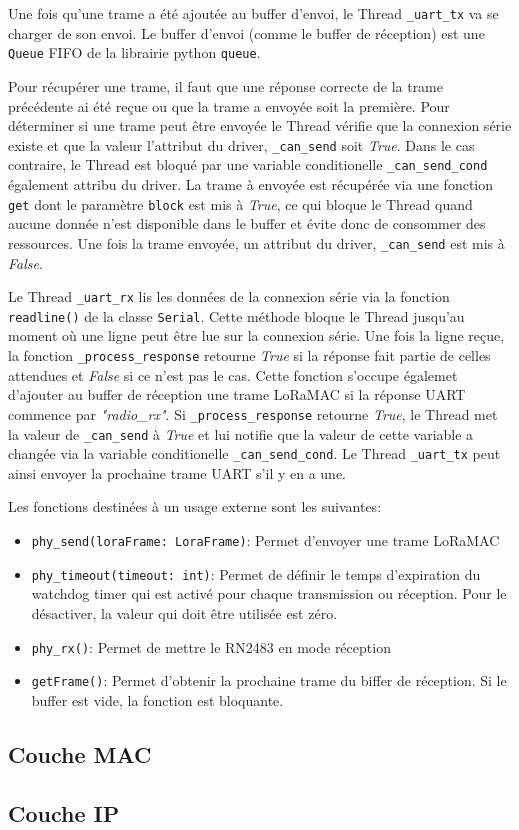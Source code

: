     Une fois qu'une trame a été ajoutée au buffer d'envoi, le Thread \texttt{\_uart\_tx} va se charger de 
    son envoi. Le buffer d'envoi (comme le buffer de réception) est une \texttt{Queue} FIFO de la librairie python \texttt{queue}.
    
    Pour récupérer une trame, il faut que une réponse correcte de la trame précédente ai été reçue ou que la trame a envoyée soit la première.
    Pour déterminer si une trame peut être envoyée le Thread vérifie que la connexion série existe 
    et que la valeur l'attribut du driver, \texttt{\_can\_send} soit \textit{True}. Dans le cas 
    contraire, le Thread est bloqué par une variable conditionelle \texttt{\_can\_send\_cond} également attribu du driver.
    La trame à envoyée est récupérée via une fonction \texttt{get} dont le paramètre \texttt{block} est 
    mis à \textit{True}, ce qui bloque le Thread quand aucune donnée n'est disponible dans le buffer et évite donc de consommer des ressources. Une fois la trame envoyée, un attribut du driver, \texttt{\_can\_send} est mis à \textit{False}.

    Le Thread \texttt{\_uart\_rx} lis les données de la connexion série via la fonction
    \texttt{readline()} de la classe \texttt{Serial}. Cette méthode bloque le Thread jusqu'au 
    moment où une ligne peut être lue sur la connexion série. Une fois la ligne reçue, la fonction 
    \texttt{\_process\_response} retourne \textit{True} si la réponse fait partie de celles 
    attendues et \textit{False} si ce n'est pas le cas. Cette fonction s'occupe égalemet d'ajouter 
    au buffer de réception une trame LoRaMAC si la réponse UART commence par \textit{"radio\_rx"}. 
    Si \texttt{\_process\_response} retourne 
    \textit{True}, le Thread met la valeur de \texttt{\_can\_send} à \textit{True} et lui notifie que la valeur de cette variable a changée via la variable conditionelle \texttt{\_can\_send\_cond}. Le Thread \texttt{\_uart\_tx} peut ainsi envoyer la prochaine trame UART s'il y en a une.

    Les fonctions destinées à un usage externe sont les suivantes:
    \begin{itemize}
        \item \texttt{phy\_send(loraFrame: LoraFrame)}: Permet d'envoyer une trame LoRaMAC
        \item \texttt{phy\_timeout(timeout: int)}: Permet de définir le temps d'expiration du watchdog timer qui est activé pour chaque transmission ou réception. Pour le désactiver, la valeur qui doit être utilisée est zéro.
        \item \texttt{phy\_rx()}: Permet de mettre le RN2483 en mode réception
        \item \texttt{getFrame()}: Permet d'obtenir la prochaine trame du biffer de réception. Si le buffer est vide, la fonction est bloquante.
    \end{itemize}

\subsection*{Couche MAC}

\subsection*{Couche IP}\label{subsec:work-loraroot:iplayer}